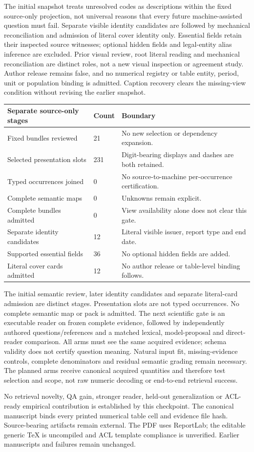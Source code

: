 \documentclass[10pt,a4paper]{article}
\begin{document}
The initial snapshot treats unresolved codes as descriptions within the fixed source-only projection, not universal reasons that every future machine-assisted question must fail. Separate visible identity candidates are followed by mechanical reconciliation and admission of literal cover identity only. Essential fields retain their inspected source witnesses; optional hidden fields and legal-entity alias inference are excluded. Prior visual review, root literal reading and mechanical reconciliation are distinct roles, not a new visual inspection or agreement study. Author release remains false, and no numerical registry or table entity, period, unit or population binding is admitted. Caption recovery clears the missing-view condition without revising the earlier snapshot.

\begin{longtable}{@{}p{}p{}p{}@{}}\toprule
\textbf{Separate source-only stages} & \textbf{Count} & \textbf{Boundary} \\ \midrule\endhead
Fixed bundles reviewed & 21 & No new selection or dependency expansion. \\
Selected presentation slots & 231 & Digit-bearing displays and dashes are both retained. \\
Typed occurrences joined & 0 & No source-to-machine per-occurrence certification. \\
Complete semantic maps & 0 & Unknowns remain explicit. \\
Complete bundles admitted & 0 & View availability alone does not clear this gate. \\
Separate identity candidates & 12 & Literal visible issuer, report type and end date. \\
Supported essential fields & 36 & No optional hidden fields are added. \\
Literal cover cards admitted & 12 & No author release or table-level binding follows. \\
\bottomrule\end{longtable}
{\small The initial semantic review, later identity candidates and separate literal-card admission are distinct stages. Presentation slots are not typed occurrences. No complete semantic map or pack is admitted.}
The next scientific gate is an executable reader on frozen complete evidence, followed by independently authored questions/references and a matched lexical, model-proposal and direct-reader comparison. All arms must see the same acquired evidence; schema validity does not certify question meaning. Natural input fit, missing-evidence controls, complete denominators and residual semantic grading remain necessary. The planned arms receive canonical acquired quantities and therefore test selection and scope, not raw numeric decoding or end-to-end retrieval success.

No retrieval novelty, QA gain, stronger reader, held-out generalization or ACL-ready empirical contribution is established by this checkpoint. The canonical manuscript binds every printed numerical table cell and evidence file hash. Source-bearing artifacts remain external. The PDF uses ReportLab; the editable generic TeX is uncompiled and ACL template compliance is unverified. Earlier manuscripts and failures remain unchanged.
\end{document}
